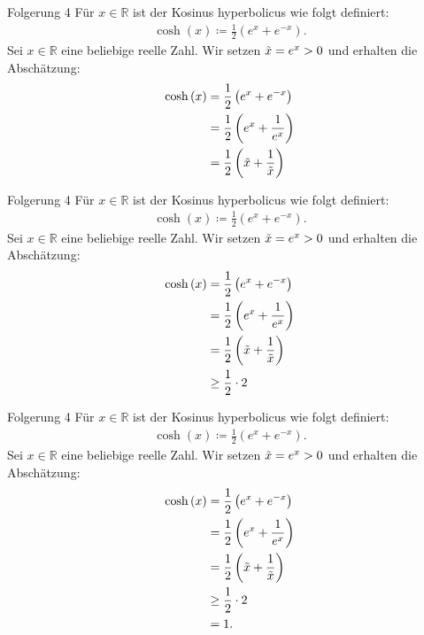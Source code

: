 \documentclass[10pt]{beamer}
\def\bR{\mathbb{R}}
\begin{document}
\begin{frame}{Folgerung 4}
    Für \( x \in \bR \) ist der Kosinus hyperbolicus wie folgt definiert:
    \begin{align*}
        \cosh\left( x \right)
        \coloneq \frac{1}{2} \left( e^{x} + e^{-x} \right).
    \end{align*}
    Sei \( x \in \bR \) eine beliebige reelle Zahl. Wir setzen \( \Tilde{x} = e^{x} > 0 \) und erhalten die Abschätzung:
    \begin{align*}
        \cosh\left( x \right)
        & = \frac{1}{2} \left( e^{x} + e^{-x} \right) \\
        & = \frac{1}{2} \left( e^{x} + \frac{1}{e^{x}} \right) \\
        & = \frac{1}{2} \left( \Tilde{x} + \frac{1}{\Tilde{x}} \right)
    \end{align*}
\end{frame}



\begin{frame}{Folgerung 4}
    Für \( x \in \bR \) ist der Kosinus hyperbolicus wie folgt definiert:
    \begin{align*}
        \cosh\left( x \right)
        \coloneq \frac{1}{2} \left( e^{x} + e^{-x} \right).
    \end{align*}
    Sei \( x \in \bR \) eine beliebige reelle Zahl. Wir setzen \( \Tilde{x} = e^{x} > 0 \) und erhalten die Abschätzung:
    \begin{align*}
        \cosh\left( x \right)
        & = \frac{1}{2} \left( e^{x} + e^{-x} \right) \\
        & = \frac{1}{2} \left( e^{x} + \frac{1}{e^{x}} \right) \\
        & = \frac{1}{2} \left( \Tilde{x} + \frac{1}{\Tilde{x}} \right) \\
        & \geq \frac{1}{2} \cdot 2
    \end{align*}
\end{frame}



\begin{frame}{Folgerung 4}
    Für \( x \in \bR \) ist der Kosinus hyperbolicus wie folgt definiert:
    \begin{align*}
        \cosh\left( x \right)
        \coloneq \frac{1}{2} \left( e^{x} + e^{-x} \right).
    \end{align*}
    Sei \( x \in \bR \) eine beliebige reelle Zahl. Wir setzen \( \Tilde{x} = e^{x} > 0 \) und erhalten die Abschätzung:
    \begin{align*}
        \cosh\left( x \right)
        & = \frac{1}{2} \left( e^{x} + e^{-x} \right) \\
        & = \frac{1}{2} \left( e^{x} + \frac{1}{e^{x}} \right) \\
        & = \frac{1}{2} \left( \Tilde{x} + \frac{1}{\Tilde{x}} \right) \\
        & \geq \frac{1}{2} \cdot 2 \\
        & = 1.
    \end{align*}
\end{frame}
\end{document}
